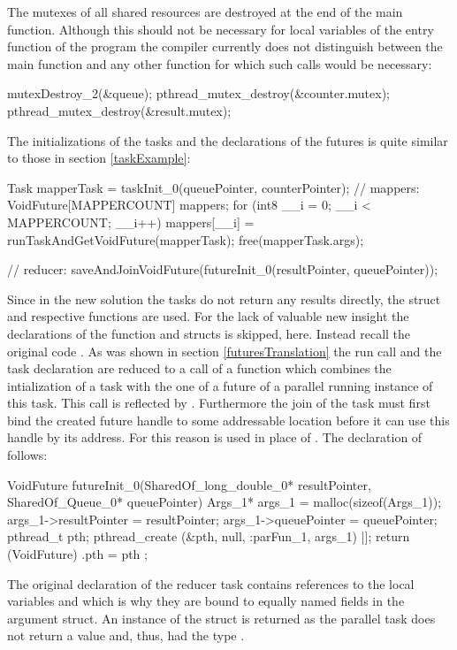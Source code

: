 The mutexes of all shared resources are destroyed at the end of the main function. Although this should not be necessary for local variables of the entry function of the program the compiler currently does not distinguish between the main function and any other function for which such calls would be necessary:
\begin{ccode}
mutexDestroy_2(&queue); 
pthread_mutex_destroy(&counter.mutex); 
pthread_mutex_destroy(&result.mutex);
\end{ccode}
The initializations of the tasks and the declarations of the futures is quite similar to those in section \ref{taskExample}:
\begin{ccode}
Task mapperTask = taskInit_0(queuePointer, counterPointer);
// mappers:
VoidFuture[MAPPERCOUNT] mappers; 
for (int8 __i = 0; __i < MAPPERCOUNT; __i++) { 
  mappers[__i] = runTaskAndGetVoidFuture(mapperTask); 
}
free(mapperTask.args);

// reducer:
saveAndJoinVoidFuture(futureInit_0(resultPointer, queuePointer));
\end{ccode}

Since in the new solution the tasks do not return any results directly, the  struct and respective functions are used. For the lack of valuable new insight the declarations of the  function and  structs is skipped, here. Instead recall the original code . As was shown in section \ref{futuresTranslation} the run call and the task declaration are reduced to a call of a function which combines the intialization of a task with the one of a future of a parallel running instance of this task. This call is reflected by . Furthermore the join of the task must first bind the created future handle to some addressable location before it can use this handle by its address. For this reason  is used in place of . The declaration of  follows:
\begin{ccode}
VoidFuture futureInit_0(SharedOf_long_double_0* resultPointer, SharedOf_Queue_0* queuePointer) { 
  Args_1* args_1 = malloc(sizeof(Args_1)); 
  args_1->resultPointer = resultPointer; 
  args_1->queuePointer = queuePointer; 
  pthread_t pth; 
  pthread_create (&pth, null, :parFun_1, args_1) |]; 
  return (VoidFuture){ .pth = pth }; 
}
\end{ccode}
The original declaration of the reducer task contains references to the local variables  and  which is why they are bound to equally named fields in the argument struct. An instance of the  struct is returned as the parallel task does not return a value and, thus, had the type .

